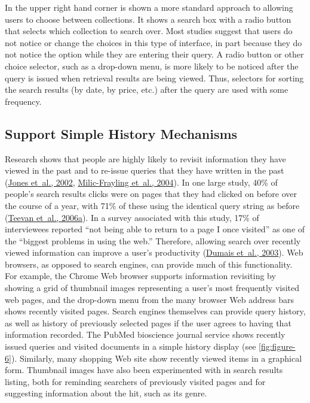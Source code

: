 \documentclass[sigconf,nonacm,screen,pbalance]{acmart}
\begin{document}
In the upper right hand corner is shown a more standard approach to allowing users to choose between
collections. It shows a search box with a radio button that selects which collection to search over.
Most studies suggest that users do not notice or change the choices in this type of interface, in part
because they do not notice the option while they are entering their query. A radio button or other
choice selector, such as a drop-down menu, is more likely to be noticed after the query is issued when
retrieval results are being viewed. Thus, selectors for sorting the search results (by date, by price,
etc.) after the query are used with some frequency.

\subsection{Support Simple History Mechanisms}

Research shows that people are highly likely to revisit information they have viewed in the past and to
re-issue queries that they have written in the past (\href{https://searchuserinterfaces.com/book/sui_references.html#jones2002oft}{Jones et~al., 2002}, \href{https://searchuserinterfaces.com/book/sui_references.html#milicfrayling2004ssu}{ Milic-Frayling et~al., 2004}). In one large study, 40\% of
people's search results clicks were on pages that they had clicked on before over the course of a year,
with 71\% of these using the identical query string as before (\href{https://searchuserinterfaces.com/book/sui_references.html#teevan2006hri}{Teevan et~al., 2006a}). In a survey associated with this study, 17\% of interviewees reported
``not being able to return to a page I once visited'' as one of the ``biggest problems in using the web.''
Therefore, allowing search over recently viewed information can improve a user's productivity (\href{https://searchuserinterfaces.com/book/sui_references.html#dumais2003svs}{Dumais et~al., 2003}). Web browsers, as opposed to search engines, can provide much of this
functionality. For example, the Chrome Web browser supports information revisiting by showing a grid of
thumbnail images representing a user's most frequently visited web pages, and the drop-down menu from
the many browser Web address bars shows recently visited pages. Search engines themselves can provide
query history, as well as history of previously selected pages if the user agrees to having that
information recorded. The PubMed bioscience journal service shows recently issued queries and visited
documents in a simple history display (see \autoref{fig:figure-6}).
Similarly, many shopping Web site show recently viewed items in a graphical form. Thumbnail images have
also been experimented with in search results listing, both for reminding searchers of previously
visited pages and for suggesting information about the hit, such as its genre.
\end{document}
